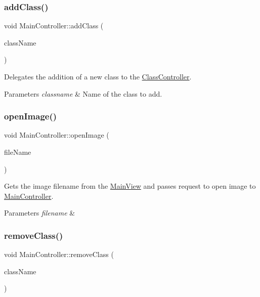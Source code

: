 \subsubsection{\texorpdfstring{add\+Class()}{addClass()}}
{\footnotesize\ttfamily void Main\+Controller\+::add\+Class (\begin{DoxyParamCaption}\item[{const Q\+String \&}]{class\+Name }\end{DoxyParamCaption})}



Delegates the addition of a new class to the \hyperlink{classClassController}{Class\+Controller}. 


\begin{DoxyParams}{Parameters}
{\em classname} & Name of the class to add. \\
\hline
\end{DoxyParams}
\mbox{\label{classMainController_a44cb414d5932db864383b9cb17c6f0b1}} 
\subsubsection{\texorpdfstring{open\+Image()}{openImage()}}
{\footnotesize\ttfamily void Main\+Controller\+::open\+Image (\begin{DoxyParamCaption}\item[{const Q\+String \&}]{file\+Name }\end{DoxyParamCaption})}



Gets the image filename from the \hyperlink{classMainView}{Main\+View} and passes request to open image to \hyperlink{classMainController}{Main\+Controller}. 


\begin{DoxyParams}{Parameters}
{\em filename} & \\
\hline
\end{DoxyParams}
\mbox{\label{classMainController_ad639a2fd588d6fe011701a5168184883}} 
\subsubsection{\texorpdfstring{remove\+Class()}{removeClass()}}
{\footnotesize\ttfamily void Main\+Controller\+::remove\+Class (\begin{DoxyParamCaption}\item[{const Q\+String \&}]{class\+Name }\end{DoxyParamCaption})}



